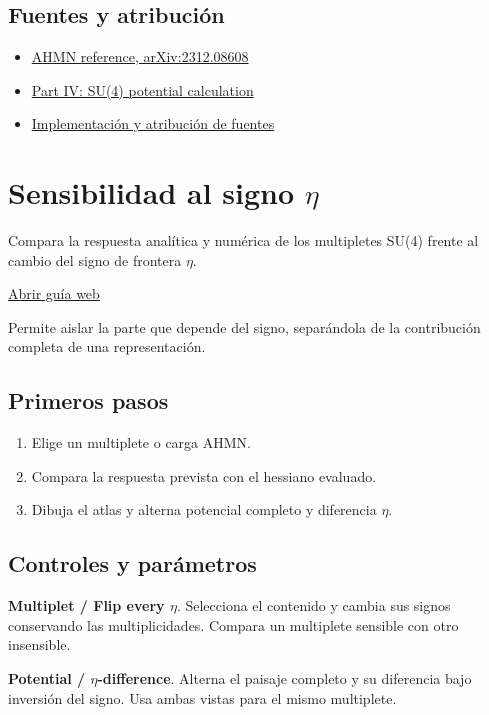 \documentclass[11pt,a4paper]{article}
\begin{document}
\subsection*{Fuentes y atribución}
\begin{itemize}
\item \href{https://arxiv.org/abs/2312.08608}{AHMN reference, arXiv:2312.08608}
\item \href{https://karlesmarin.github.io/ghu-explorer/papers/part-iv/index.html}{Part IV: SU(4) potential calculation}
\item \href{https://github.com/karlesmarin/ghu-lab/blob/main/src/sections/calculator_section.js}{Implementación y atribución de fuentes}
\end{itemize}
\section{Sensibilidad al signo \ensuremath{\eta}}
Compara la respuesta analítica y numérica de los multipletes SU(4) frente al cambio del signo de frontera \ensuremath{\eta}.

\href{https://karlesmarin.github.io/ghu-explorer/guide/es/eta/index.html}{Abrir guía web}

Permite aislar la parte que depende del signo, separándola de la contribución completa de una representación.
\subsection*{Primeros pasos}
\begin{enumerate}
\item Elige un multiplete o carga AHMN.
\item Compara la respuesta prevista con el hessiano evaluado.
\item Dibuja el atlas y alterna potencial completo y diferencia \ensuremath{\eta}.
\end{enumerate}
\subsection*{Controles y parámetros}
\textbf{Multiplet / Flip every \ensuremath{\eta}}. Selecciona el contenido y cambia sus signos conservando las multiplicidades. Compara un multiplete sensible con otro insensible.

\textbf{Potential / \ensuremath{\eta}-difference}. Alterna el paisaje completo y su diferencia bajo inversión del signo. Usa ambas vistas para el mismo multiplete.
\end{document}
